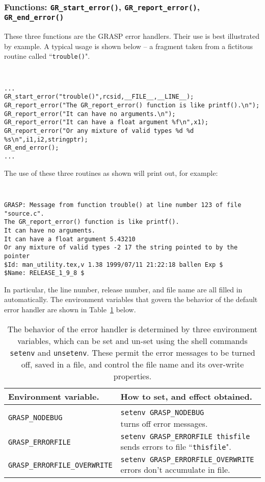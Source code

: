 \clearpage
\subsubsection{Functions: {\tt GR\_start\_error()}, {\tt GR\_report\_error()}, {\tt GR\_end\_error()}}
\label{ss:error}

These three functions are the GRASP error handlers.  Their use is best
illustrated by example.  A typical usage is shown below -- a fragment
taken from a fictitous routine called ``{\tt trouble()}".
{\tt 
\begin{verbatim}
...
GR_start_error("trouble()",rcsid,__FILE__,__LINE__);
GR_report_error("The GR_report_error() function is like printf().\n");
GR_report_error("It can have no arguments.\n");
GR_report_error("It can have a float argument %f\n",x1);
GR_report_error("Or any mixture of valid types %d %d %s\n",i1,i2,stringptr);
GR_end_error();
...
\end{verbatim}}
\noindent
The use of these three routines as shown will print out, for example:
{\tt 
\begin{verbatim}
GRASP: Message from function trouble() at line number 123 of file "source.c".
The GR_report_error() function is like printf().
It can have no arguments.
It can have a float argument 5.43210
Or any mixture of valid types -2 17 the string pointed to by the pointer
$Id: man_utility.tex,v 1.38 1999/07/11 21:22:18 ballen Exp $
$Name: RELEASE_1_9_8 $
\end{verbatim}}
\noindent
In particular, the line number, release number, and file name are all
filled in automatically.  The environment variables that govern the
behavior of the default error handler are shown in
Table~\ref{t:errorenv} below.
\begin{table}[b]
\begin{tabular}{lp{3 in}}
Environment variable. & How to set, and effect obtained.\\
\hline 
{\tt GRASP\_NODEBUG}  & {\tt setenv GRASP\_NODEBUG}  $\qquad \qquad \qquad $ turns off error messages. \\
{\tt GRASP\_ERRORFILE}  &  {\tt setenv  GRASP\_ERRORFILE thisfile} sends errors to file ``{\tt thisfile}". \\
{\tt GRASP\_ERRORFILE\_OVERWRITE}  &  {\tt setenv  GRASP\_ERRORFILE\_OVERWRITE} errors don't accumulate in file.
\end{tabular}
\caption{The behavior of the error handler is determined by three
environment variables, which can be set and un-set using the shell
commands {\tt setenv} and {\tt unsetenv}.  These permit the error
messages to be turned off, saved in a file, and control the file name
and its over-write properties.}
\label{t:errorenv}
\end{table}

